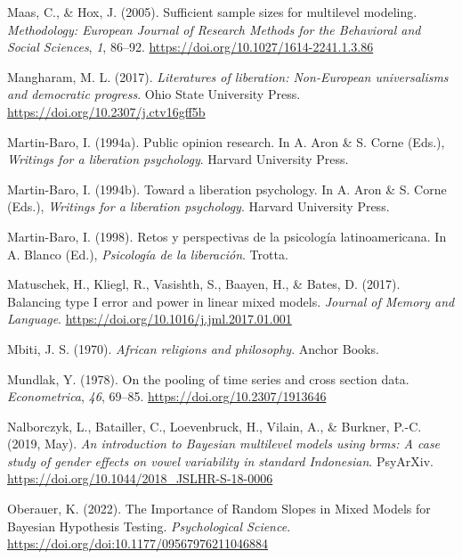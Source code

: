 \documentclass[
  letterpaper,
  DIV=11,
  numbers=noendperiod]{scrreprt}
\newlength{\cslhangindent}
\newenvironment{CSLReferences}[2] %
 {\begin{list}{}{%
  \setlength{\itemindent}{0pt}
  \setlength{\leftmargin}{0pt}
  \setlength{\parsep}{0pt}
  \ifodd #1
   \setlength{\leftmargin}{\cslhangindent}
   \setlength{\itemindent}{-1\cslhangindent}
  \fi
  \setlength{\itemsep}{#2\baselineskip}}}
 {\end{list}}
\begin{document}
\begin{CSLReferences}{1}{0}
Maas, C., \& Hox, J. (2005). Sufficient sample sizes for multilevel
modeling. \emph{Methodology: European Journal of Research Methods for
the Behavioral and Social Sciences}, \emph{1}, 86--92.
\url{https://doi.org/10.1027/1614-2241.1.3.86}

Mangharam, M. L. (2017). \emph{Literatures of liberation: Non-{E}uropean
universalisms and democratic progress}. Ohio State University Press.
\url{https://doi.org/10.2307/j.ctv16gff5b}

Martin-Baro, I. (1994a). Public opinion research. In A. Aron \& S. Corne
(Eds.), \emph{Writings for a liberation psychology}. Harvard University
Press.

Martin-Baro, I. (1994b). Toward a liberation psychology. In A. Aron \&
S. Corne (Eds.), \emph{Writings for a liberation psychology}. Harvard
University Press.

Martin-Baro, I. (1998). {Retos y perspectivas de la psicología
latinoamericana}. In A. Blanco (Ed.), \emph{Psicología de la
liberación}. Trotta.

Matuschek, H., Kliegl, R., Vasishth, S., Baayen, H., \& Bates, D.
(2017). Balancing type {I} error and power in linear mixed models.
\emph{Journal of Memory and Language}.
\url{https://doi.org/10.1016/j.jml.2017.01.001}

Mbiti, J. S. (1970). \emph{African religions and philosophy}. Anchor
Books.

Mundlak, Y. (1978). On the pooling of time series and cross section
data. \emph{Econometrica}, \emph{46}, 69--85.
\url{https://doi.org/10.2307/1913646}

Nalborczyk, L., Batailler, C., Loevenbruck, H., Vilain, A., \& Burkner,
P.-C. (2019, May). \emph{An introduction to {B}ayesian multilevel models
using brms: A case study of gender effects on vowel variability in
standard {I}ndonesian}. PsyArXiv.
\url{https://doi.org/10.1044/2018_JSLHR-S-18-0006}

Oberauer, K. (2022). {The Importance of Random Slopes in Mixed Models
for Bayesian Hypothesis Testing}. \emph{Psychological Science}.
\url{https://doi.org/doi:10.1177/09567976211046884}


\end{CSLReferences}
\end{document}
